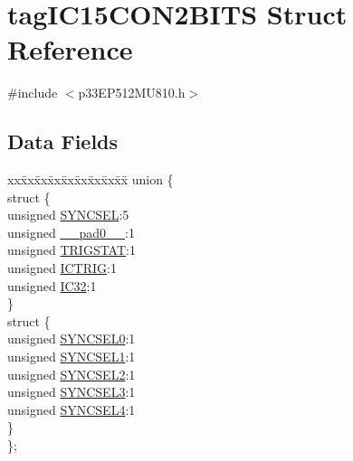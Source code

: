 \hypertarget{structtag_i_c15_c_o_n2_b_i_t_s}{}\section{tag\+I\+C15\+C\+O\+N2\+B\+I\+TS Struct Reference}
\label{structtag_i_c15_c_o_n2_b_i_t_s}


{\ttfamily \#include $<$p33\+E\+P512\+M\+U810.\+h$>$}

\subsection*{Data Fields}
\begin{DoxyCompactItemize}
\item 
\begin{tabbing}
xx\=xx\=xx\=xx\=xx\=xx\=xx\=xx\=xx\=\kill
union \{\\
\>struct \{\\
\>\>unsigned \hyperlink{structtag_i_c15_c_o_n2_b_i_t_s_a35fbbe11485c2615ed27535b62c3fa35}{SYNCSEL}:5\\
\>\>unsigned \hyperlink{structtag_i_c15_c_o_n2_b_i_t_s_adf71f3d8410c1f1dbbc96680a92c49af}{\_\_pad0\_\_}:1\\
\>\>unsigned \hyperlink{structtag_i_c15_c_o_n2_b_i_t_s_ab379549de54ac93ad4aa73686c34cb7c}{TRIGSTAT}:1\\
\>\>unsigned \hyperlink{structtag_i_c15_c_o_n2_b_i_t_s_a79bd14cfd2e403f3a96ce0b3bb58097b}{ICTRIG}:1\\
\>\>unsigned \hyperlink{structtag_i_c15_c_o_n2_b_i_t_s_afc705120246cb4ca0c93c87817519b7f}{IC32}:1\\
\>\} \\
\>struct \{\\
\>\>unsigned \hyperlink{structtag_i_c15_c_o_n2_b_i_t_s_a3b5df3154fde5141e6ac0156425ff8b4}{SYNCSEL0}:1\\
\>\>unsigned \hyperlink{structtag_i_c15_c_o_n2_b_i_t_s_a50e73f95ab1c258ddc64f69c0991deaf}{SYNCSEL1}:1\\
\>\>unsigned \hyperlink{structtag_i_c15_c_o_n2_b_i_t_s_a304907a5d2c4cbf1114a54642a85951e}{SYNCSEL2}:1\\
\>\>unsigned \hyperlink{structtag_i_c15_c_o_n2_b_i_t_s_a6bbd1bd2ead6c9fa713969c6eb0f0c75}{SYNCSEL3}:1\\
\>\>unsigned \hyperlink{structtag_i_c15_c_o_n2_b_i_t_s_a0cd5bbe196c7974953909d27a6307bb7}{SYNCSEL4}:1\\
\>\} \\
\}; \\

\end{tabbing}\end{DoxyCompactItemize}


